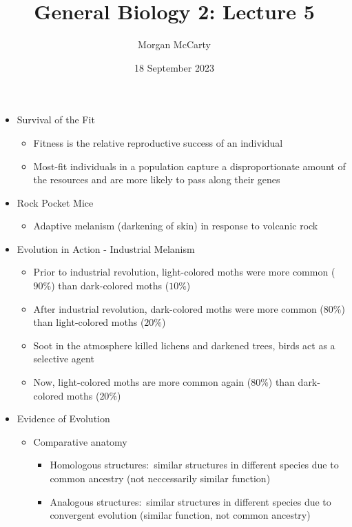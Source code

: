 \documentclass[12pt]{article}
\title{
    General Biology 2: Lecture 5}
\author{Morgan McCarty}
\date{18 September 2023}
\begin{document}
    \maketitle

    \begin{itemize}
        \item Survival of the Fit
        \begin{itemize}
            \item Fitness is the relative reproductive success of an individual
            \item Most-fit individuals in a population capture a disproportionate amount of the resources and are more likely to pass along their genes
        \end{itemize}
        \item Rock Pocket Mice
        \begin{itemize}
            \item Adaptive melanism (darkening of skin) in response to volcanic rock
        \end{itemize}
        \item Evolution in Action - Industrial Melanism
        \begin{itemize}
            \item Prior to industrial revolution, light-colored moths were more common ($90\%$) than dark-colored moths ($10\%$)
            \item After industrial revolution, dark-colored moths were more common ($80\%$) than light-colored moths ($20\%$)
            \item Soot in the atmosphere killed lichens and darkened trees, birds act as a selective agent
            \item Now, light-colored moths are more common again ($80\%$) than dark-colored moths ($20\%$)
        \end{itemize}
        \item Evidence of Evolution
        \begin{itemize}
            \item Comparative anatomy
            \begin{itemize}
                \item Homologous structures:\ similar structures in different species due to common ancestry (not neccessarily similar function)
                \item Analogous structures:\ similar structures in different species due to convergent evolution (similar function, not common ancestry)

\end{itemize}
\end{itemize}
\end{itemize}
\end{document}
